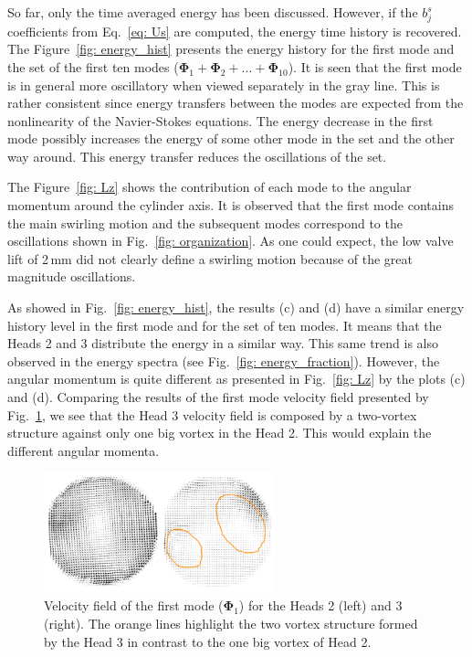 \documentclass[12pt,a4paper]{article}
\newcommand{\bv}[1]{\mathbf{#1}}
\begin{document}
So far, only the time averaged energy has been discussed. However, if the $b^{s}_{j}$ coefficients from Eq.~\eqref{eq: Us} are computed, the energy time history is recovered. The Figure~\ref{fig: energy_hist} presents the energy history for the first mode and the set of the first ten modes ($\bv{\Phi}_1 + \bv{\Phi}_2 + ... +\bv{\Phi}_{10}$). It is seen that the first mode is in general more oscillatory when viewed separately in the gray line.  This is rather consistent since energy transfers between the modes are expected from the nonlinearity of the Navier-Stokes equations. The energy decrease in the first mode possibly increases the energy of some other mode in the set and the other way around. This energy transfer reduces the oscillations of the set.

The Figure~\ref{fig: Lz} shows the contribution of each mode to the angular momentum around the cylinder axis. It is observed that the first mode contains the main swirling motion and the subsequent modes correspond to the oscillations shown in Fig.~\ref{fig: organization}. As one could expect, the low valve lift of 2\,mm did not clearly define a swirling motion because of the great magnitude oscillations.

As showed in Fig.~\ref{fig: energy_hist}, the results (c) and (d) have a similar energy history level in the first mode and for the set of ten modes. It means that the Heads 2 and 3 distribute the energy in a similar way. This same trend is also observed in the  energy spectra (see Fig.~\ref{fig: energy_fraction}). However, the angular momentum is quite different as presented in Fig.~\ref{fig: Lz} by the plots (c) and (d). Comparing the results of the first mode velocity field presented by Fig.~\ref{fig: scaniavssygma}, we see that the Head 3 velocity field is composed by a two-vortex structure against only one big vortex in the Head 2. This would explain the different angular momenta.


\begin{figure}[h]
 \centering
 \includegraphics[width=0.6\textwidth]{./imgs/scania-vs-sygma.png}
 \caption{Velocity field of the first mode ($\bv{\Phi}_1$) for the Heads 2 (left) and 3 (right). The orange lines highlight the two vortex structure formed by the Head 3 in contrast to the one big vortex of Head 2.}
 \label{fig: scaniavssygma}
\end{figure}
\end{document}
